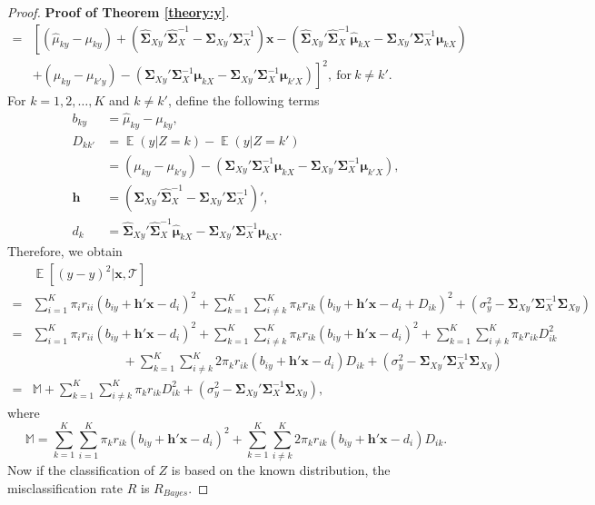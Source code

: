 \documentclass[10pt,a4paper]{amsart}
\DeclareMathOperator{\E}{\mathbb{E}}
\begin{document}
\begin{proof}{\textbf{Proof of Theorem \ref{theory:y}}.}{}
\begin{align*}
=&\left[(\hat{\mu}_{ky}-\mu_{ky})+\left(\hat{\bm \Sigma}_{Xy}' \hat{\bm \Sigma}_{X}^{-1} - \bm \Sigma_{Xy}' \bm \Sigma_{X}^{-1} \right) \bm x - \left(\hat{\bm \Sigma}_{Xy}' \hat{\bm \Sigma}_{X}^{-1} \hat{\bm \mu}_{kX}-\bm \Sigma_{Xy}' \bm \Sigma_{X}^{-1}\bm \mu_{kX}\right)\right.\\
&+\left.(\mu_{ky}-\mu_{k'y})-\left(\bm \Sigma_{Xy}' \bm \Sigma_{X}^{-1} \bm \mu_{kX}-\bm \Sigma_{Xy}' \bm \Sigma_{X}^{-1}\bm \mu_{k'X}\right)\right]^2,~\mbox{for}~k \neq k'.
\end{align*}
For $k = 1,2,\ldots,K$ and $k \neq k'$, define the following terms
\begin{align*}
b_{ky} &=\hat{\mu}_{ky}-\mu_{ky},\\
D_{kk'} &=\E(y|Z=k)-\E(y|Z=k')   \\
&=(\mu_{ky}-\mu_{k'y})-\left(\bm \Sigma_{Xy}' \bm \Sigma_{X}^{-1}\bm \mu_{kX}-\bm \Sigma_{Xy}' \bm \Sigma_{X}^{-1}\bm \mu_{k'X}\right),\\
\bm h &=\left(\hat{\bm \Sigma}_{Xy}' \hat{\bm \Sigma}_{X}^{-1}-\bm \Sigma_{Xy}' \bm \Sigma_{X}^{-1}\right)',\\
d_k &=\hat{\bm \Sigma}_{Xy}' \hat{\bm \Sigma}_{X}^{-1}\hat{\bm \mu}_{kX}-\bm \Sigma_{Xy}' \bm \Sigma_{X}^{-1}\bm \mu_{kX}.
\end{align*}
Therefore, we obtain
\begin{align*}
&\E[(\hat{y}-y)^2|\bm x, \mathcal{T}] \\
=& \sum_{i=1}^K \pi_i r_{ii} (b_{iy}+\bm h' \bm x-d_i)^2 + \sum_{k=1}^K \sum_{i \neq k}^K \pi_k r_{ik} (b_{iy}+\bm h' \bm x-d_i + D_{ik})^2 + (\sigma_y^2 - \bm \Sigma_{Xy}' \bm \Sigma_{X}^{-1} \bm \Sigma_{Xy}) \\
=& \sum_{i=1}^K \pi_i r_{ii} (b_{iy}+\bm h' \bm x-d_i)^2 + \sum_{k=1}^K \sum_{i \neq k}^K \pi_k r_{ik} (b_{iy}+\bm h' \bm x-d_i)^2 + \sum_{k=1}^K \sum_{i \neq k}^K \pi_k r_{ik} D_{ik}^2 \\
&~~~~~~~~~~~~~~~~~~~~~~~~~~~~~~~~+ \sum_{k=1}^K \sum_{i \neq k}^K 2 \pi_k r_{ik} (b_{iy}+\bm h' \bm x-d_i) D_{ik} + (\sigma_y^2 - \bm \Sigma_{Xy}' \bm \Sigma_{X}^{-1} \bm \Sigma_{Xy})  \\
=& \mathbb{M} + \sum_{k=1}^K \sum_{i \neq k}^K \pi_k r_{ik} D_{ik}^2 +  (\sigma_y^2 - \bm \Sigma_{Xy}' \bm \Sigma_{X}^{-1} \bm \Sigma_{Xy}),
\end{align*}
where $$\mathbb{M} = \sum_{k=1}^K \sum_{i=1}^K \pi_k r_{ik} (b_{iy}+\bm h' \bm x-d_i)^2 + \sum_{k=1}^K \sum_{i \neq k}^K 2 \pi_k r_{ik} (b_{iy}+\bm h' \bm x-d_i) D_{ik}.$$
Now if the classification of $Z$ is based on the known distribution, the misclassification rate $R$ is $R_{Bayes}$.

\end{proof}
\end{document}
